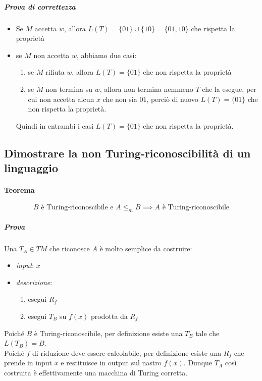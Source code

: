 \subparagraph{Prova di correttezza}

\begin{itemize}
\item Se $M$ accetta $w$, allora $L(T) = \{01 \} \cup \{ 10 \} = \{01, 10\} $ che rispetta la proprietà

\item se $M$ non accetta $w$, abbiamo due casi:
\begin{enumerate}
\item se $M$ rifiuta $w$, allora $L(T) = \{ 01 \}$ che non rispetta la proprietà
\item se $M$ non termina su $w$, allora non termina nemmeno $T$ che la esegue, per cui non accetta alcun $x$ che non sia $01$, perciò di nuovo $L(T) = \{ 01 \}$ che non rispetta la proprietà.
\end{enumerate}
Quindi in entrambi i casi $L(T) = \{01\}$ che non rispetta la proprietà.
\end{itemize}

\subsection{Dimostrare la non Turing-riconoscibilità di un linguaggio}

\paragraph{Teorema}
\[
	B \text{ è Turing-riconoscibile e } A \leq_m B \implies A \text{ è Turing-riconoscibile}
\]

\subparagraph{Prova}

Una $T_A \in TM$ che riconosce $A$ è molto semplice da costruire:
\begin{itemize}
\item \textit{input}: $x$
\item \textit{descrizione}:
\begin{enumerate}
\item esegui $R_f$
\item esegui $T_B$ su $f(x)$ prodotta da $R_f$
\end{enumerate}
\end{itemize}
Poiché $B$ è Turing-riconoscibile, per definizione esiste una $T_B$ tale che $L(T_B) = B$.\\
Poiché $f$ di riduzione deve essere calcolabile, per definizione esiste una $R_f$ che prende in input $x$ e restituisce in output sul nastro $f(x)$. Dunque $T_A$ così costruita è effettivamente una macchina di Turing corretta.

